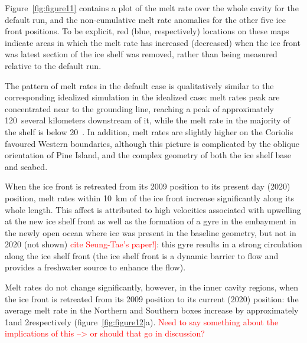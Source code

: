 \documentclass[draft]{agujournal2019}
\newcommand{\red}[1]{\textcolor{red}{#1}}
\begin{document}
Figure~\ref{fig:figure11} contains a plot of the melt rate over the whole cavity for the default run, and the non-cumulative melt rate anomalies for the other five ice front positions. To be explicit, red (blue, respectively) locations on these maps indicate areas in which the melt rate has increased (decreased) when the ice front was latest section of the ice shelf was removed, rather than being measured relative to the default run. 

The pattern of melt rates in the default case is qualitatively similar to the corresponding idealized simulation in the idealized case: melt rates peak are concentrated near to the grounding line, reaching a peak of approximately 120~\mpryr several kilometers downstream of it, while the melt rate in the majority of the shelf is below 20~\mpryr. In addition, melt rates are slightly higher on the Coriolis favoured Western boundaries, although this picture is complicated by the oblique orientation of Pine Island, and the complex geometry of both the ice shelf base and seabed.

When the ice front is retreated from its 2009 position to its present day (2020) position, melt rates within 10~km of the ice front increase significantly along its whole length. This affect is attributed to high velocities associated with upwelling at the new ice shelf front as well as the formation of a gyre in the embayment in the newly open ocean where ice was present in the baseline geometry, but not in 2020 (not shown) \red{cite Seung-Tae's paper!]}: this gyre results in a strong circulation along the ice shelf front (the ice shelf front is a dynamic barrier to flow and provides a freshwater source to enhance the flow). 

Melt rates do not change significantly, however, in the inner cavity regions, when the ice front is retreated from its 2009 position to its current (2020) position: the average melt rate in the Northern and Southern boxes increase by approximately 1\mpryr and 2\mpryr respectively (figure~\ref{fig:figure12}a). \red{Need to say something about the implications of this --> or should that go in discussion?}
\end{document}
